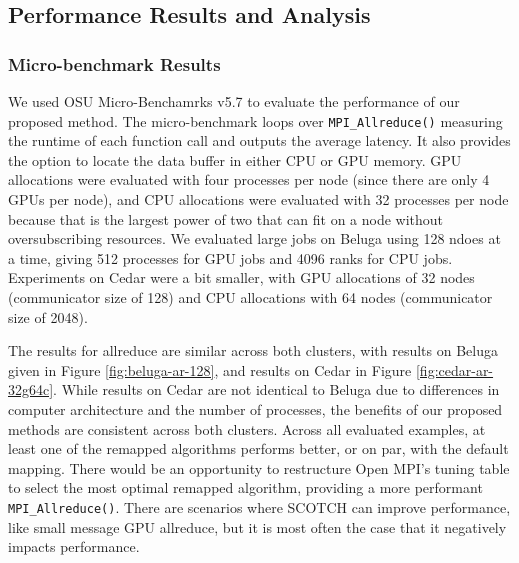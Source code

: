 \subsection{Performance Results and Analysis}

\subsubsection{Micro-benchmark Results}

We used OSU Micro-Benchamrks v5.7 \cite{Bureddy2012OMB} to evaluate the performance of our proposed method. 
The micro-benchmark loops over \texttt{MPI\_Allreduce()} measuring the runtime of each function call and outputs the average latency. 
It also provides the option to locate the data buffer in either \gls{CPU} or \gls{GPU} memory.
GPU allocations were evaluated with four processes per node (since there are only 4 \gls{GPU}s per node), and \gls{CPU} allocations were evaluated with 32 processes per node because that is the largest power of two that can fit on a node without oversubscribing resources.
We evaluated large jobs on Beluga using 128 ndoes at a time, giving 512 processes for \gls{GPU} jobs and 4096 ranks for \gls{CPU} jobs.
Experiments on Cedar were a bit smaller, with \gls{GPU} allocations of 32 nodes (communicator size of 128) and \gls{CPU} allocations with 64 nodes (communicator size of 2048).






The results for allreduce are similar across both clusters, with results on Beluga given in Figure \ref{fig:beluga-ar-128}, and results on Cedar in Figure \ref{fig:cedar-ar-32g64c}.
While results on Cedar are not identical to Beluga due to differences in computer architecture and the number of processes, the benefits of our proposed methods are consistent across both clusters.
Across all evaluated examples, at least one of the remapped algorithms performs better, or on par, with the default mapping. 
There would be an opportunity to restructure Open MPI's tuning table to select the most optimal remapped algorithm, providing a more performant \texttt{MPI\_Allreduce()}.
There are scenarios where SCOTCH can improve performance, like small message \gls{GPU} allreduce, but it is most often the case that it negatively impacts performance.

